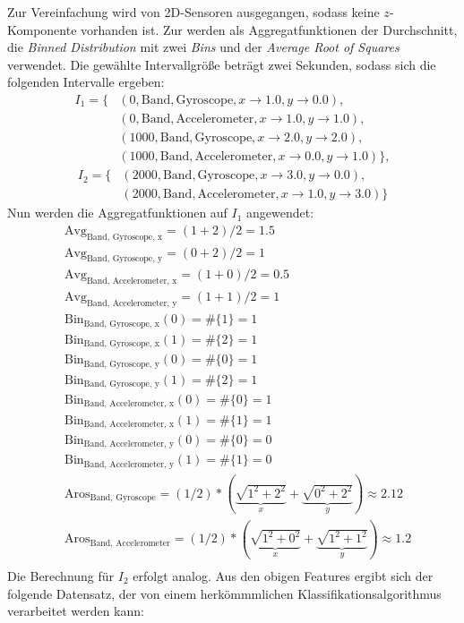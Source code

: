 Zur Vereinfachung wird von 2D-Sensoren ausgegangen, sodass keine $z$-Komponente vorhanden ist. Zur werden als Aggregatfunktionen der Durchschnitt, die \textit{Binned Distribution} mit zwei \textit{Bins} und der \textit{Average Root of Squares} verwendet. Die gewählte Intervallgröße beträgt zwei Sekunden, sodass sich die folgenden Intervalle ergeben:
\begin{align*}
I_1 = \{&(0, \text{Band}, \text{Gyroscope}, {x \to 1.0, y \to 0.0}), \\
&(0, \text{Band}, \text{Accelerometer}, {x \to 1.0, y \to 1.0}), \\
&(1000, \text{Band}, \text{Gyroscope}, {x \to 2.0, y \to 2.0}), \\
&(1000, \text{Band}, \text{Accelerometer}, {x \to 0.0, y \to 1.0})\},
\end{align*}
\begin{align*}
I_2 = \{&(2000, \text{Band}, \text{Gyroscope}, {x \to 3.0, y \to 0.0}), \\
&(2000, \text{Band}, \text{Accelerometer}, {x \to 1.0, y \to 3.0})\}
\end{align*}
Nun werden die Aggregatfunktionen auf $I_1$ angewendet:
\begin{align*}
&\text{Avg}_\text{Band, Gyroscope, x} = (1 + 2)/2 = 1.5 \\
&\text{Avg}_\text{Band, Gyroscope, y} = (0 + 2)/2 = 1 \\
&\text{Avg}_\text{Band, Accelerometer, x} = (1 + 0)/2 = 0.5 \\
&\text{Avg}_\text{Band, Accelerometer, y} = (1 + 1)/2 = 1 \\
&\text{Bin}_\text{Band, Gyroscope, x}(0) = \#\{1\} = 1 \\
&\text{Bin}_\text{Band, Gyroscope, x}(1) = \#\{2\} = 1 \\
&\text{Bin}_\text{Band, Gyroscope, y}(0) = \#\{0\} = 1 \\
&\text{Bin}_\text{Band, Gyroscope, y}(1) = \#\{2\} = 1 \\
&\text{Bin}_\text{Band, Accelerometer, x}(0) = \#\{0\} = 1 \\
&\text{Bin}_\text{Band, Accelerometer, x}(1) = \#\{1\} = 1 \\
&\text{Bin}_\text{Band, Accelerometer, y}(0) = \#\{0\} = 0 \\
&\text{Bin}_\text{Band, Accelerometer, y}(1) = \#\{1\} = 0 \\
&\text{Aros}_\text{Band, Gyroscope} = (1/2) * (\underbrace{\sqrt{1^2 + 2^2}}_x + \underbrace{\sqrt{0^2 + 2^2}}_y) \approx 2.12 \\
&\text{Aros}_\text{Band, Accelerometer} = (1/2) * (\underbrace{\sqrt{1^2 + 0^2}}_x + \underbrace{\sqrt{1^2 + 1^2}}_y) \approx 1.2 \\
\end{align*}
Die Berechnung für $I_2$ erfolgt analog. Aus den obigen Features ergibt sich der folgende Datensatz, der von einem herkömmmlichen Klassifikationsalgorithmus verarbeitet werden kann:\\

